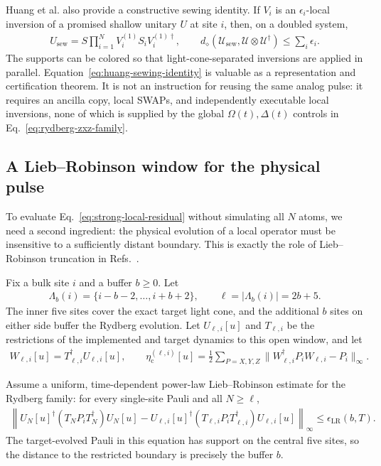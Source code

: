Huang et al. also provide a constructive sewing identity.  If $V_i$ is an
$\epsilon_i$-local inversion of a promised shallow unitary $U$ at site $i$,
then, on a doubled system,
\begin{align}
U_{\mathrm{sew}}
=S\prod_{i=1}^{N}V_i^{(1)}S_iV_i^{(1)\dagger},
\qquad
d_\diamond(\mathcal U_{\mathrm{sew}},
\mathcal U\otimes\mathcal U^\dagger)
\leq\sum_i\epsilon_i.
\label{eq:huang-sewing-identity}
\end{align}
The supports can be colored so that light-cone-separated inversions are
applied in parallel.  Equation~\eqref{eq:huang-sewing-identity} is valuable as
a representation and certification theorem.  It is not an instruction for
reusing the same analog pulse: it requires an ancilla copy, local SWAPs, and
independently executable local inversions, none of which is supplied by the
global $\Omega(t),\Delta(t)$ controls in
Eq.~\eqref{eq:rydberg-zxz-family}.

\subsection{A Lieb--Robinson window for the physical pulse}

To evaluate Eq.~\eqref{eq:strong-local-residual} without simulating all $N$
atoms, we need a second ingredient: the physical evolution of a local operator
must be insensitive to a sufficiently distant boundary.  This is exactly the
role of Lieb--Robinson truncation in Refs.~\cite{haah_2018_quantum,
mizuta_2022_local,else_2020_improved}.

Fix a bulk site $i$ and a buffer $b\geq0$.  Let
\begin{align}
\Lambda_{b}(i)=\{i-b-2,\ldots,i+b+2\},
\qquad
\ell=|\Lambda_b(i)|=2b+5.
\label{eq:zxz-training-window}
\end{align}
The inner five sites cover the exact target light cone, and the additional
$b$ sites on either side buffer the Rydberg evolution.  Let
$U_{\ell,i}[u]$ and $T_{\ell,i}$ be the restrictions of the implemented and
target dynamics to this open window, and let
\begin{align}
W_{\ell,i}[u]=T_{\ell,i}^\dagger U_{\ell,i}[u],
\qquad
\eta_{\mathrm c}^{(\ell,i)}[u]
=\frac{1}{2}\sum_{P=X,Y,Z}
\|W_{\ell,i}^\dagger P_iW_{\ell,i}-P_i\|_\infty.
\label{eq:window-local-residual}
\end{align}

Assume a uniform, time-dependent power-law Lieb--Robinson estimate for the
Rydberg family: for every single-site Pauli and all $N\geq\ell$,
\begin{align}
\left\|U_N[u]^\dagger(T_NP_iT_N^\dagger)U_N[u]
-U_{\ell,i}[u]^\dagger
(T_{\ell,i}P_iT_{\ell,i}^\dagger)U_{\ell,i}[u]
\right\|_\infty
\leq\epsilon_{\mathrm{LR}}(b,T).
\label{eq:rydberg-lr-window-assumption}
\end{align}
The target-evolved Pauli in this equation has support on the central five
sites, so the distance to the restricted boundary is precisely the buffer
$b$.

